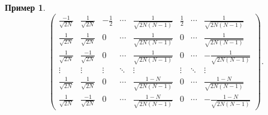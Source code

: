 \documentclass[a4paper]{article}
\newtheorem{example}{Пример}
\begin{document}
\begin{example}
\[\begin{pmatrix}
             \frac{-1}{\sqrt{2N}} & \frac{1}{\sqrt{2N}}  & -\frac12 & \cdots & \frac{1}{\sqrt{2N(N-1)}}   & \frac12  & \cdots & \frac{1}{\sqrt{2N(N-1)}} \\
             \frac{1}{\sqrt{2N}}  & \frac{1}{\sqrt{2N}}  & 0        & \cdots & \frac{1}{\sqrt{2N(N-1)}}   & 0        & \cdots & \frac{1}{\sqrt{2N(N-1)}} \\
             \frac{1}{\sqrt{2N}}  & \frac{-1}{\sqrt{2N}} & 0        & \cdots & \frac{1}{\sqrt{2N(N-1)}}   & 0        & \cdots & -\frac{1}{\sqrt{2N(N-1)}} \\
             \vdots               & \vdots               & \vdots   & \ddots & \vdots                     & \vdots   & \ddots & \vdots \\
             \frac{1}{\sqrt{2N}}  & \frac{1}{\sqrt{2N}}  & 0        & \cdots & \frac{1-N}{\sqrt{2N(N-1)}} & 0        & \cdots & \frac{1-N}{\sqrt{2N(N-1)}} \\
             \frac{1}{\sqrt{2N}}  & \frac{-1}{\sqrt{2N}} & 0        & \cdots & \frac{1-N}{\sqrt{2N(N-1)}} & 0        & \cdots & -\frac{1-N}{\sqrt{2N(N-1)}}
         \end{pmatrix}. \]
 \end{example}

 \printbibliography
\end{document}
